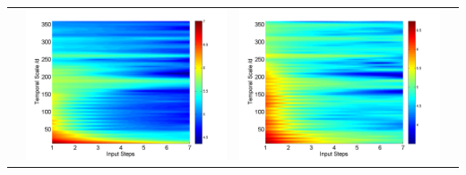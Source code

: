 \documentclass[draft,wrr]{AGUTeX}
\begin{document}
\begin{article}
\begin{table}[H]
\begin{tabular}{cccc}
&\begin{minipage}{.3\textwidth}\includegraphics[width=\linewidth]{resultgraph/11532500p_rela.png}\end{minipage}
&\begin{minipage}{.3\textwidth}\includegraphics[width=\linewidth]{resultgraph/11532500pep_rela.png}\end{minipage}

\end{tabular}
\end{table}
\end{article}
\end{document}
